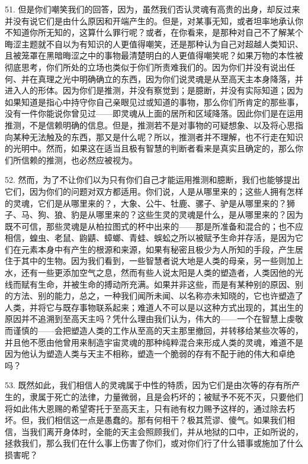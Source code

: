 51. 但是你们嘲笑我们的回答，因为，虽然我们否认灵魂有高贵的出身，却反过来并没有说它们是由什么原因和开端产生的。但是，对某事无知，或者坦率地承认你不知道你所无知的，这算什么罪行呢？或者，在你看来，是那种对自己不了解某个晦涩主题就不自以为有知识的人更值得嘲笑，还是那种认为自己对超越人类知识、且被笼罩在黑暗晦涩之中的事物最清楚明白的人更值得嘲笑呢？如果万物的本性被彻底思考，你们所处的立场也类似于你们所责难我们的。因为你们并没有说出任何、并在真理之光中明确确立的东西，因为你们说灵魂是从至高天主本身降落，并进入人的形体。因为你们是推测，并没有察觉到；是臆断，并没有实际知道；因为如果知道是指心中持守你自己亲眼见过或知道的事物，那么你们所肯定的那些事，没有一件你能说你曾见过——即灵魂从上面的居所和区域降落。因此你们是在运用推测，不是信赖明确的信息。但是，推测若不是对事物的可疑想象、以及将心思指向某种无法触及的东西，那又是什么呢？所以，推测者并不理解，也不行走在知识的光明中。然而，如果这在适当且极有智慧的判断者看来是真实且确定的，那么你们所信赖的推测，也必然应被视为。\par

52. 然而，为了不让你们以为只有你们自己才能运用推测和臆断，我们也能够提出它们，因为你们的问题对双方都适用。你们说，人是从哪里来的；这些人拥有怎样的灵魂，它们是从哪里来的？，大象、公牛、牡鹿、骡子、驴是从哪里来的？狮子、马、狗、狼、豹是从哪里来的？这些生灵的灵魂是什么，是从哪里来的？因为既不可信，那些灵魂是从柏拉图式的杯中出来的——那是所准备和混合的；也不应相信，蝗虫、老鼠、鼩鼱、蟑螂、青蛙、蜈蚣之所以被赋予生命并存活，是因为它们在元素本身中有产生的根源和来源，如果有秘密且极少为人所知的手段，产生居住于其中的生物。因为我们看到，一些智慧者说大地是人类的母亲，另一些则加上水，还有一些更添加空气之息，然而有些人说太阳是人类的塑造者，人类因他的光线而赋有生命，并被生命的搏动所充满。如果并非这些，而是有某种别的原因、别的方法、别的能力，总之，一种我们闻所未闻、以名称亦未知晓的，它也许塑造了人类，并将它与既存事物联系起来；难道人不可以是以这种方式出现的，其出生的原因并不追溯到至高天主吗？凭什么理由我们认为，伟大的——一个在智慧上虔敬而谨慎的——会把塑造人类的工作从至高的天主那里撤回，并转移给某些次等的，并且他不愿由他曾用来制造宇宙灵魂的那种纯粹混合来形成人类的灵魂，难道不是因为他认为塑造人类与天主不相称，塑造一个脆弱的存有不配于祂的伟大和卓绝吗？\par

53. 既然如此，我们相信人的灵魂属于中性的特质，因为它们是由次等的存有所产生的，隶属于死亡的法律，力量微弱，且是会朽坏的；被赋予不死不灭，只要他们将如此伟大恩赐的希望寄托于至高天主，只有祂有权力赐予这样的，通过除去朽坏。但，我们相信这一点是愚蠢的。那有何相干？极其荒谬、傻气。如果我们相信，当我们离开身体时，全能的天主会照顾我们，并从地狱的口中，正如所说的，拯救我们，那么我们在什么事上伤害了你们，或对你们行了什么错事或施加了什么损害呢？\par

